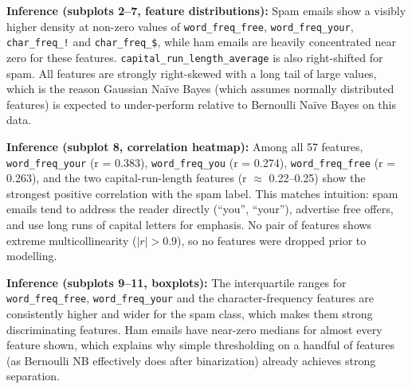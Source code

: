 \documentclass[12pt,a4paper]{article}
\begin{document}
\textbf{Inference (subplots 2--7, feature distributions):} Spam emails show a visibly
higher density at non-zero values of \texttt{word\_freq\_free}, \texttt{word\_freq\_your},
\texttt{char\_freq\_!} and \texttt{char\_freq\_\$}, while ham emails are heavily
concentrated near zero for these features. \texttt{capital\_run\_length\_average} is also
right-shifted for spam. All features are strongly right-skewed with a long tail of large
values, which is the reason Gaussian Na\"ive Bayes (which assumes normally distributed
features) is expected to under-perform relative to Bernoulli Na\"ive Bayes on this data.

\textbf{Inference (subplot 8, correlation heatmap):} Among all 57 features,
\texttt{word\_freq\_your} (r = 0.383), \texttt{word\_freq\_you} (r = 0.274),
\texttt{word\_freq\_free} (r = 0.263), and the two capital-run-length features
(r $\approx$ 0.22--0.25) show the strongest positive correlation with the spam label.
This matches intuition: spam emails tend to address the reader directly (``you'',
``your''), advertise free offers, and use long runs of capital letters for emphasis. No
pair of features shows extreme multicollinearity ($|r| > 0.9$), so no features were
dropped prior to modelling.

\textbf{Inference (subplots 9--11, boxplots):} The interquartile ranges for
\texttt{word\_freq\_free}, \texttt{word\_freq\_your} and the character-frequency features
are consistently higher and wider for the spam class, which makes them strong
discriminating features. Ham emails have near-zero medians for almost every feature
shown, which explains why simple thresholding on a handful of features (as Bernoulli NB
effectively does after binarization) already achieves strong separation.
\end{document}
